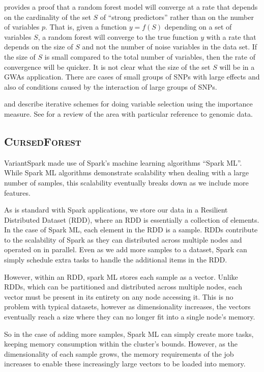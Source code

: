 \documentclass[10pt,letterpaper]{article}
\newcommand{\cursedforest}{\textsc{CursedForest}\xspace}
\begin{document}
\cite{Bau.2012} provides a proof that a random forest model will converge at a rate that depends on
the cardinality of the set $S$ of ``strong predictors'' rather than on the number of variables $p$. That is, given a
function $y=f(S)$ depending on a set of variables $S$, a random forest will converge to the true function $y$ with a
rate that depends on the size of $S$ and not the number of noise variables in the data set. If the size of $S$ is small
compared to the total number of variables, then the rate of convergence will be quicker. It is not clear what the size
of the set $S$ will be in a GWAs application. There are cases of small groups of SNPs with large effects and also of
conditions caused by the interaction of large groups of SNPs.

\cite{Genuer.et.al.2010} and \cite{Diaz.and.Alvarez.2006} describe iterative schemes for doing variable selection using
the importance measure. See \cite{Chen.and.Ishwaran.2012} for a review of the area with particular reference to genomic
data.

\subsection{\cursedforest}
VariantSpark made use of Spark's machine learning algorithms ``Spark ML''. While Spark ML algorithms demonstrate
scalability when dealing with a large number of samples, this scalability eventually breaks down as we include more
features.

As is standard with Spark applications, we store our data in a Resilient Distributed Dataset (RDD), where an RDD is
essentially a collection of elements. In the case of Spark ML, each element in the RDD is a sample. RDDs contribute to
the scalability of Spark as they can distributed across multiple nodes and operated on in parallel. Even as we add more
samples to a dataset, Spark can simply schedule extra tasks to handle the additional items in the RDD.

However, within an RDD, spark ML stores each sample as a vector. Unlike RDDs, which can be partitioned and distributed
across multiple nodes, each vector must be present in its entirety on any node accessing it. This is no problem with
typical datasets, however as dimensionality increases, the vectors eventually reach a size where they can no longer fit
into a single node's memory.

So in the case of adding more samples, Spark ML can simply create more tasks, keeping memory consumption within the
cluster's bounds. However, as the dimensionality of each sample grows, the memory requirements of the job increases to
enable these increasingly large vectors to be loaded into memory.  
\end{document}
